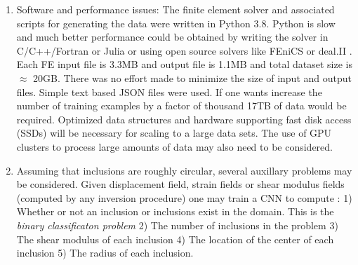 \documentclass[12pt]{article}
\begin{document}
\begin{enumerate}
\item{Software and performance issues: The finite element solver and associated scripts for generating the data were written in Python 3.8. Python is slow and much better performance could be obtained by writing the solver in C/C++/Fortran or Julia or using open source solvers like FEniCS \cite{paper:fenics} or deal.II \cite{misc:deal.ii}. Each FE input file is 3.3MB and output file is 1.1MB and total dataset size is $\approx$  20GB. There was no effort made to minimize the size of input and output files. Simple text based JSON files were used. If one wants increase the number of training examples by a factor of thousand 17TB of data would be required. Optimized data structures and hardware supporting fast disk access (SSDs) will be necessary for scaling to a large data sets. The use of GPU clusters to process large amounts of data may also need to be considered. }
\item{Assuming that inclusions are roughly circular, several auxillary problems may be considered. Given displacement field, strain fields or shear modulus fields (computed by any inversion procedure) one may train a CNN to compute : 1) Whether or not an inclusion or inclusions exist  in the domain. This is the \textit{binary classificaton problem} 2) The number of inclusions in the problem 3) The shear modulus of each inclusion 4) The location of the center of each inclusion 5) The radius of each inclusion. }
\end{enumerate}
\clearpage
{}

\end{document}
